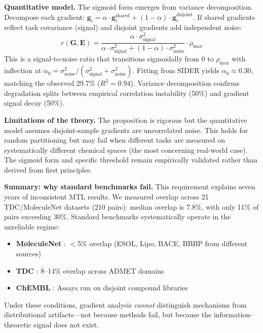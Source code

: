 \documentclass{article}
\newcommand{\G}{\mathbf{G}}
\newcommand{\E}{\mathbf{E}}
\begin{document}
\textbf{Quantitative model.} The sigmoid form emerges from variance decomposition. Decompose each gradient: $\mathbf{g}_i = \alpha \cdot \mathbf{g}_i^{\text{shared}} + (1-\alpha) \cdot \mathbf{g}_i^{\text{disjoint}}$. If shared gradients reflect task covariance (signal) and disjoint gradients add independent noise:
\begin{equation}
    r(\G, \E) = \frac{\alpha \cdot \sigma^2_{\text{signal}}}{\alpha \cdot \sigma^2_{\text{signal}} + (1-\alpha) \cdot \sigma^2_{\text{noise}}} \cdot \rho_{\text{max}}
\label{eq:theory}
\end{equation}
This is a signal-to-noise ratio that transitions sigmoidally from 0 to $\rho_{\text{max}}$ with inflection at $\alpha_0 = \sigma^2_{\text{noise}} / (\sigma^2_{\text{signal}} + \sigma^2_{\text{noise}})$. Fitting from SIDER yields $\alpha_0 \approx 0.30$, matching the observed 29.7\% ($R^2 = 0.94$). Variance decomposition confirms degradation splits between empirical correlation instability (50\%) and gradient signal decay (50\%).

\textbf{Limitations of the theory.} The proposition is rigorous but the quantitative model assumes disjoint-sample gradients are uncorrelated noise. This holds for random partitioning but may fail when different tasks are measured on systematically different chemical spaces (the most concerning real-world case). The sigmoid form and specific threshold remain empirically validated rather than derived from first principles.

\textbf{Summary: why standard benchmarks fail.} This requirement explains seven years of inconsistent MTL results. We measured overlap across 21 TDC/MoleculeNet datasets (210 pairs): median overlap is 7.8\%, with only 11\% of pairs exceeding 30\%. Standard benchmarks systematically operate in the unreliable regime:
\begin{itemize}[nosep,topsep=0pt]
    \item \textbf{MoleculeNet} \citep{wu2018moleculenet}: $<$5\% overlap (ESOL, Lipo, BACE, BBBP from different sources)
    \item \textbf{TDC} \citep{huang2021therapeutics}: 8--14\% overlap across ADMET domains
    \item \textbf{ChEMBL} \citep{gaulton2012chembl}: Assays run on disjoint compound libraries
\end{itemize}%
Under these conditions, gradient analysis \textit{cannot} distinguish mechanisms from distributional artifacts---not because methods fail, but because the information-theoretic signal does not exist.
\end{document}
